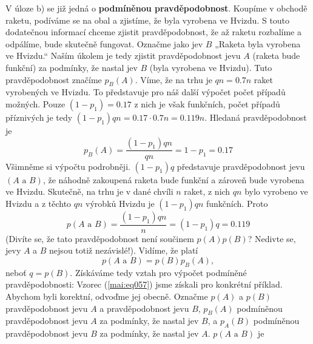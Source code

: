 \begin{example}
    V úloze b) se již jedná o \textbf{podmíněnou pravděpodobnost}. Koupíme v obchodě raketu, 
    podíváme se na obal a zjistíme, že byla vyrobena ve Hvizdu. S touto dodatečnou informací chceme 
    zjistit pravděpodobnost, že až raketu rozbalíme a odpálíme, bude skutečně fungovat. Označme 
    jako jev \(B\) „Raketa byla vyrobena ve Hvizdu.“ Naším úkolem je tedy zjistit pravděpodobnost 
    jevu \(A\) (raketa bude funkční) za podmínky, že nastal jev \(B\) (byla vyrobena ve Hvizdu). 
    Tuto pravděpodobnost značíme \(p_B(A)\). Víme, že na trhu je \(qn = \num{0.7}n\) raket 
    vyrobených ve Hvizdu. To představuje pro náš další výpočet počet případů možných. Pouze \((1 - 
    p_1) = \num{0.17}\) z nich je však funkčních, počet případů příznivých je tedy \((1 - p_1)qn = 
    \num{0.17}\cdot\num{0.7}n = \num{0.119}n\). Hledaná pravděpodobnost je
    \begin{equation*}
      p_B(A) = \dfrac{(1 - p_1)qn}{qn} = 1 - p_1 = \num{0.17}
    \end{equation*}
    Všimněme si výpočtu podrobněji. \((1 - p_1)q\) představuje pravděpodobnost jevu \((A\text{ a 
    }B)\), že náhodně zakoupená raketa bude funkční a zároveň bude vyrobena ve Hvizdu. Skutečně, na 
    trhu je v dané chvíli \(n\) raket, z nich \(qn\) bylo vyrobeno ve Hvizdu a z těchto \(qn\) 
    výrobků Hvizdu je \((1 - p_1)qn\) funkčních. Proto 
    \begin{equation*}
      p(A\text{ a }B) = \dfrac{(1 - p_1)qn}{n} = (1 - p_1)q = \num{0.119}
    \end{equation*}
    (Divíte se, že tato pravděpodobnost není součinem \(p(A)p(B)\)? Nedivte se, jevy \(A\) a \(B\) 
    nejsou totiž nezávislé!). Vidíme, že platí
    \begin{equation*}
      p(A\text{ a }B) = p(B)p_B(A),
    \end{equation*}
    neboť \(q = p(B)\). Získáváme tedy vztah pro výpočet podmíněné pravděpodobnosti:
    Vzorec (\ref{mai:eq057}) jsme získali pro konkrétní příklad. Abychom byli korektní, odvoďme jej 
    obecně. Označme \(p(A)\) a \(p(B)\) pravděpodobnost jevu \(A\) a pravděpodobnost jevu \(B\), 
    \(p_B(A)\) podmíněnou pravděpodobnost jevu \(A\) za podmínky, že nastal jev \(B\), a \(p_A(B)\) 
    podmíněnou pravděpodobnost jevu \(B\) za podmínky, že nastal jev \(A\). \(p(A\text{ a }B)\) je 

\end{example}
